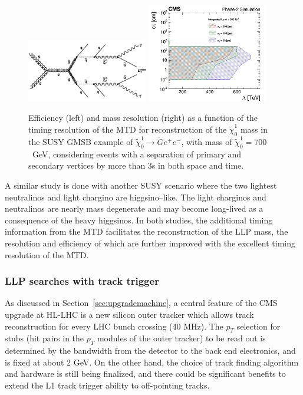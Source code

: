 \begin{figure}[hbtp]\begin{center}
\includegraphics[width=0.47\textwidth]{figures/MTD/diagram.png}
\includegraphics[width=0.47\textwidth]{figures/MTD/Limits_excl_2D_ComparingRes.png}
\caption{ 
Efficiency (left) and mass resolution (right) as a function of the timing resolution of the MTD for reconstruction of the $\tilde{\chi}_0^1$ mass in the SUSY GMSB example of $\tilde{\chi}_0^1 \to \tilde{G} e^{+} e^{-}$, with
mass of $\tilde{\chi}_0^1=700$~GeV, considering events with a separation of primary and secondary vertices by more than 3s in both space and time.
}
\label{fig:cmsupgrade_mtd}
\end{center}
\end{figure}

A similar study is done with another SUSY scenario where the two lightest neutralinos and light chargino are higgsino–like. The light charginos and neutralinos are nearly mass degenerate and
may become long-lived as a consequence of the heavy higgsinos. 
In both studies, the additional timing information from the MTD facilitates the reconstruction of the LLP mass, the resolution and efficiency of which are further improved with the excellent timing resolution of the MTD.


\subsubsection{LLP searches with track trigger}

As discussed in Section~\ref{sec:upgrademachine}, a central feature of the CMS upgrade at HL-LHC is a new silicon outer tracker which allows track reconstruction for every LHC bunch crossing (40 MHz). 
The $p_T$ selection for stubs (hit pairs in the $p_T$ modules of the outer tracker) to be read out is determined by the bandwidth from the detector 
to the back end electronics, and is fixed at about 2 GeV. 
On the other hand, the choice of track finding algorithm and hardware is still being finalized, and there could be significant benefits to extend the L1 track trigger ability to off-pointing tracks. 

